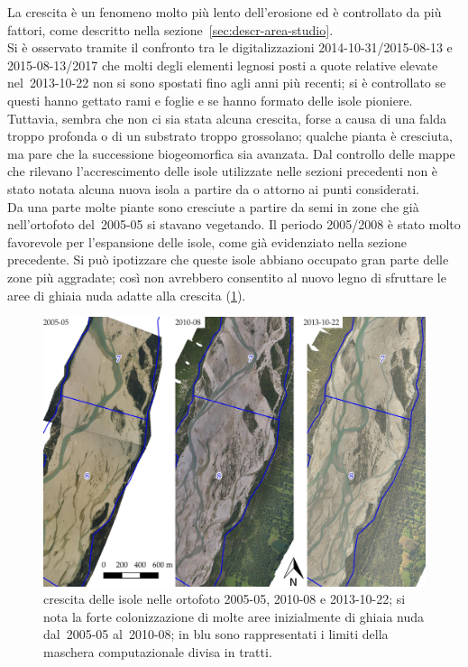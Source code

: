 La crescita è un fenomeno molto più lento dell'erosione ed è controllato da più fattori, come descritto nella sezione~\ref{sec:descr-area-studio}.
\\
Si è osservato tramite il confronto tra le digitalizzazioni 2014-10-31/2015-08-13 e 2015-08-13/2017 che molti degli elementi legnosi posti a quote relative elevate nel~2013-10-22 non si sono spostati fino agli anni più recenti; si è controllato se questi hanno gettato rami e foglie e se hanno formato delle isole pioniere.
Tuttavia, sembra che non ci sia stata alcuna crescita, forse a causa di una falda troppo profonda o di un substrato troppo grossolano; qualche pianta è cresciuta, ma pare che la successione biogeomorfica sia avanzata.
Dal controllo delle mappe che rilevano l'accrescimento delle isole utilizzate nelle sezioni precedenti non è stato notata alcuna nuova isola a partire da o attorno ai punti considerati.
\\
Da una parte molte piante sono cresciute a partire da semi in zone che già nell'ortofoto del~2005-05 si stavano vegetando. Il periodo 2005/2008 è stato molto favorevole per l'espansione delle isole, come già evidenziato nella sezione precedente.
Si può ipotizzare che queste isole abbiano occupato gran parte delle zone più aggradate; così non avrebbero consentito al nuovo legno di sfruttare le aree di ghiaia nuda adatte alla crescita (\cref{fig:crescita-2005-2010-2013}).
%
\begin{figure}
	\centering
	\includegraphics[width = \textwidth]{files/crescita_2005_2010_2013.jpeg}
	\caption[crescita delle isole nelle ortofoto 2005-05, 2010-08 e 2013-10-22]{crescita delle isole nelle ortofoto 2005-05, 2010-08 e 2013-10-22; si nota la forte colonizzazione di molte aree inizialmente di ghiaia nuda dal~2005-05 al~2010-08; in blu sono rappresentati i limiti della maschera computazionale divisa in tratti.}
	\label{fig:crescita-2005-2010-2013}
\end{figure}
%
